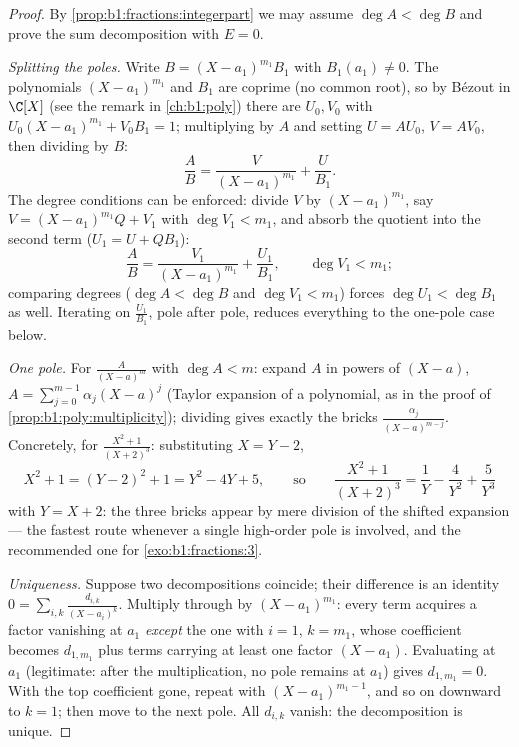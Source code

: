 \begin{proof}
By \cref{prop:b1:fractions:integerpart} we may assume $\deg A < \deg
B$ and prove the sum decomposition with $E = 0$.

\emph{Splitting the poles.} Write $B = (X - a_1)^{m_1} B_1$ with
$B_1(a_1) \neq 0$. The polynomials $(X-a_1)^{m_1}$ and $B_1$ are
coprime (no common root), so by Bézout in $\C[X]$ (see the remark in
\cref{ch:b1:poly}) there are $U_0, V_0$ with $U_0 (X-a_1)^{m_1} +
V_0 B_1 = 1$; multiplying by $A$ and setting $U = AU_0$, $V =
AV_0$, then dividing by $B$:
\[
\frac AB = \frac{V}{(X - a_1)^{m_1}} + \frac{U}{B_1} .
\]
The degree conditions can be enforced: divide $V$ by
$(X-a_1)^{m_1}$, say $V = (X-a_1)^{m_1}Q + V_1$ with $\deg V_1 <
m_1$, and absorb the quotient into the second term ($U_1 = U +
QB_1$):
\[
\frac AB = \frac{V_1}{(X - a_1)^{m_1}} + \frac{U_1}{B_1},
\qquad \deg V_1 < m_1 ;
\]
comparing degrees ($\deg A < \deg B$ and $\deg V_1 < m_1$) forces
$\deg U_1 < \deg B_1$ as well. Iterating on $\frac{U_1}{B_1}$,
pole after pole, reduces everything to the one-pole case below.

\emph{One pole.} For $\frac{A}{(X-a)^m}$ with $\deg A < m$: expand $A$
in powers of $(X - a)$, $A = \sum_{j=0}^{m-1} \alpha_j (X - a)^j$
(Taylor expansion of a polynomial, as in the proof of
\cref{prop:b1:poly:multiplicity}); dividing gives exactly the bricks
$\frac{\alpha_j}{(X-a)^{m-j}}$. Concretely, for $\frac{X^2 +
1}{(X+2)^3}$: substituting $X = Y - 2$,
\[
X^2 + 1 = (Y - 2)^2 + 1 = Y^2 - 4Y + 5 ,
\qquad\text{so}\qquad
\frac{X^2+1}{(X+2)^3} = \frac1{Y} - \frac4{Y^2} + \frac5{Y^3}
\]
with $Y = X + 2$: the three bricks appear by mere division of the
shifted expansion --- the fastest route whenever a single
high-order pole is involved, and the recommended one for
\cref{exo:b1:fractions:3}.

\emph{Uniqueness.} Suppose two decompositions coincide; their
difference is an identity $0 = \sum_{i,k} \frac{d_{i,k}}{(X -
a_i)^k}$. Multiply through by $(X - a_1)^{m_1}$: every term
acquires a factor vanishing at $a_1$ \emph{except} the one with
$i = 1$, $k = m_1$, whose coefficient becomes $d_{1,m_1}$ plus
terms carrying at least one factor $(X - a_1)$. Evaluating at
$a_1$ (legitimate: after the multiplication, no pole remains at
$a_1$) gives $d_{1,m_1} = 0$. With the top coefficient gone,
repeat with $(X - a_1)^{m_1 - 1}$, and so on downward to $k = 1$;
then move to the next pole. All $d_{i,k}$ vanish: the
decomposition is unique.
\end{proof}

